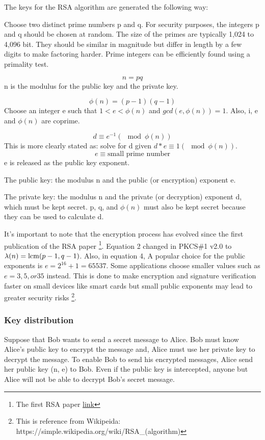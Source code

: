 \documentclass[]{article}
\begin{document}
The keys for the RSA algorithm are generated the following way:

Choose two distinct prime numbers p and q. For security purposes, the integers p and q should be chosen at random. The size of the primes are typically 1,024 to 4,096 bit. They should be similar in magnitude but differ in length by a few digits to make factoring harder. Prime integers can be efficiently found using a primality test.

\begin{equation}
	n = pq
\end{equation}
n is the modulus for the public key and the private key.

\begin{equation}
	 \phi (n)=(p-1)(q-1)
\end{equation}
Choose an integer e such that \(1 < e < \phi(n)\) and \(gcd(e, \phi(n)) = 1\). Also, i, e and \(\phi(n)\) are coprime.

\begin{equation}
	d \equiv e^{-1} (\mod\phi(n))
\end{equation}
This is more clearly stated as: solve for d given \(d * e \equiv 1 (\mod \phi(n))\).
\begin{equation}
	e \equiv \text{small  prime  number}
\end{equation}
e is released as the public key exponent.

The public key: the modulus n and the public (or encryption) exponent e. 

The private key: the modulus n and the private (or decryption) exponent d, which must be kept secret. p, q, and \(\phi(n)\) must also be kept secret because they can be used to calculate d.

\bigskip

It's important to note that the encryption process has evolved since the first publication of the RSA paper \footnote{The first RSA paper \href{https://goo.gl/UWT0zd}{link}}. Equation 2 changed in PKCS\#1 v2.0 to \( \lambda (n)={\rm {lcm}}(p-1,q-1)\). Also, in equation 4, A popular choice for the public exponents is \(e = 2^{16} + 1 = 65537\). Some applications choose smaller values such as \(e = 3, 5, or 35\)  instead. This is done to make encryption and signature verification faster on small devices like smart cards but small public exponents may lead to greater security risks \footnote{This is reference from Wikipeida: https://simple.wikipedia.org/wiki/RSA\_(algorithm)}.

\subsubsection{Key distribution}
Suppose that Bob wants to send a secret message to Alice. Bob must know Alice's public key to encrypt the message and, Alice must use her private key to decrypt the message. To enable Bob to send his encrypted messages, Alice send her public key (n, e) to Bob. Even if the public key is intercepted, anyone but Alice will not be able to decrypt Bob's secret message. 
\end{document}
